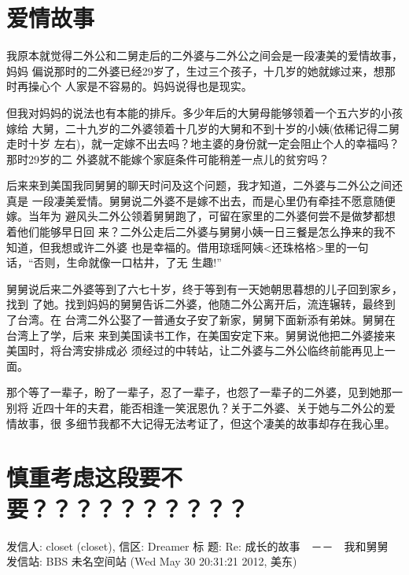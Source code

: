 \documentclass[12pt]{book}
\begin{document}
\section{爱情故事}
\label{sec-9-56}

我原本就觉得二外公和二舅走后的二外婆与二外公之间会是一段凄美的爱情故事，妈妈
偏说那时的二外婆已经29岁了，生过三个孩子，十几岁的她就嫁过来，想那时再操心个
人家是不容易的。妈妈说得也是现实。

但我对妈妈的说法也有本能的排斥。多少年后的大舅母能够领着一个五六岁的小孩嫁给
大舅，二十九岁的二外婆领着十几岁的大舅和不到十岁的小姨(依稀记得二舅走时十岁
左右)，就一定嫁不出去吗？地主婆的身份就一定会阻止个人的幸福吗？那时29岁的二
外婆就不能嫁个家庭条件可能稍差一点儿的贫穷吗？

后来来到美国我同舅舅的聊天时问及这个问题，我才知道，二外婆与二外公之间还真是
一段凄美爱情。舅舅说二外婆不是嫁不出去，而是心里仍有牵挂不愿意随便嫁。当年为
避风头二外公领着舅舅跑了，可留在家里的二外婆何尝不是做梦都想着他们能够早日回
来？二外公走后二外婆与舅舅小姨一日三餐是怎么挣来的我不知道，但我想或许二外婆
也是幸福的。借用琼瑶阿姨<还珠格格>里的一句话，“否则，生命就像一口枯井，了无
生趣!”

舅舅说后来二外婆等到了六七十岁，终于等到有一天她朝思暮想的儿子回到家乡，找到
了她。找到妈妈的舅舅告诉二外婆，他随二外公离开后，流连辗转，最终到了台湾。在
台湾二外公娶了一普通女子安了新家，舅舅下面新添有弟妹。舅舅在台湾上了学，后来
来到美国读书工作，在美国安定下来。舅舅说他把二外婆接来美国时，将台湾安排成必
须经过的中转站，让二外婆与二外公临终前能再见上一面。

那个等了一辈子，盼了一辈子，忍了一辈子，也怨了一辈子的二外婆，见到她那一别将
近四十年的夫君，能否相逢一笑泯恩仇？关于二外婆、关于她与二外公的爱情故事，很
多细节我都不大记得无法考证了，但这个凄美的故事却存在我心里。
\section{慎重考虑这段要不要？？？？？？？？？？}
\label{sec-9-57}
发信人: closet (closet), 信区: Dreamer
标  题: Re: 成长的故事　－－　我和舅舅
发信站: BBS 未名空间站 (Wed May 30 20:31:21 2012, 美东)
\end{document}
